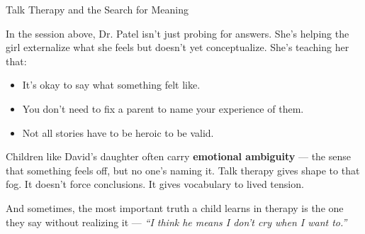 \begin{PsychologicalSidebar}{Talk Therapy and the Search for Meaning}
    \medskip
    
    In the session above, Dr. Patel isn’t just probing for answers. She’s helping the girl externalize 
    what she feels but doesn’t yet conceptualize.  
    She’s teaching her that:
    
    \begin{itemize}
      \item It’s okay to say what something felt like.
      \item You don’t need to fix a parent to name your experience of them.
      \item Not all stories have to be heroic to be valid.
    \end{itemize}
    
    \medskip
    
    Children like David’s daughter often carry \textbf{emotional ambiguity} — the sense that something feels 
    off, but no one’s naming it. Talk therapy gives shape to that fog. It doesn’t force conclusions. It 
    gives vocabulary to lived tension.
    
    And sometimes, the most important truth a child learns in therapy is the one they say without realizing 
    it —  \textit{``I think he means I don’t cry when I want to.''}
    
\end{PsychologicalSidebar}
   